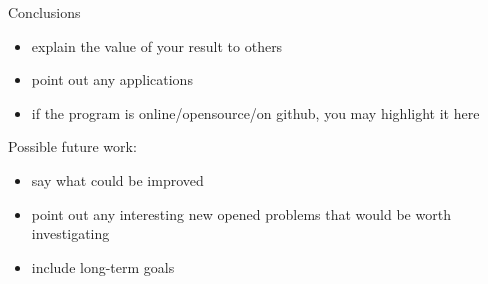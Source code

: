 \documentclass[portrait,a0paper,fontscale=0.25]{baposter}
\begin{document}
\begin{poster}
\begin{posterbox}[column=1, name=conclusion, below=result3, bottomaligned=something2]{Conclusions}
\begin{itemize}
\item explain the value of your result to others
\item point out any applications
\item if the program is online/opensource/on github, you may highlight it here
\end{itemize}
Possible future work:
\begin{itemize}
\item say what could be improved
\item point out any interesting new opened problems that would be worth investigating
\item include long-term goals
\end{itemize}
\end{posterbox}

\end{poster}
\end{document}
